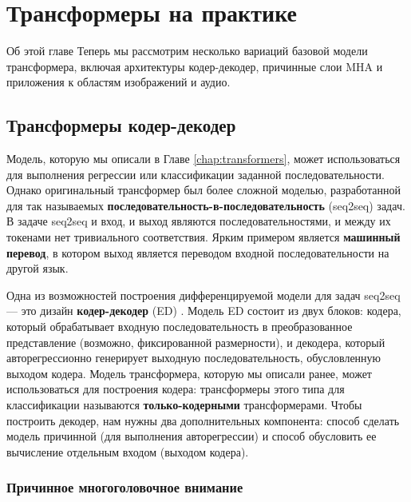 \chapter{Трансформеры на практике}
\label{chap:transformers_in_practice}

\begin{supportbox}{Об этой главе}
Теперь мы рассмотрим несколько вариаций базовой модели трансформера, включая архитектуры кодер-декодер, причинные слои MHA и приложения к областям изображений и аудио.
\end{supportbox}

\section{Трансформеры кодер-декодер}

Модель, которую мы описали в Главе \ref{chap:transformers}, может использоваться для выполнения регрессии или классификации заданной последовательности. Однако оригинальный трансформер \cite{vaswani2017attention} был более сложной моделью, разработанной для так называемых \textbf{последовательность-в-последовательность} (seq2seq) задач. В задаче seq2seq и вход, и выход являются последовательностями, и между их токенами нет тривиального соответствия. Ярким примером является \textbf{машинный перевод}, в котором выход является переводом входной последовательности на другой язык.

Одна из возможностей построения дифференцируемой модели для задач seq2seq — это дизайн \textbf{кодер-декодер} (ED) \cite{sutskever2014sequence}. Модель ED состоит из двух блоков: кодера, который обрабатывает входную последовательность в преобразованное представление (возможно, фиксированной размерности), и декодера, который авторегрессионно генерирует выходную последовательность, обусловленную выходом кодера. Модель трансформера, которую мы описали ранее, может использоваться для построения кодера: трансформеры этого типа для классификации называются \textbf{только-кодерными} трансформерами. Чтобы построить декодер, нам нужны два дополнительных компонента: способ сделать модель причинной (для выполнения авторегрессии) и способ обусловить ее вычисление отдельным входом (выходом кодера).

\subsection{Причинное многоголовочное внимание} \addclock

